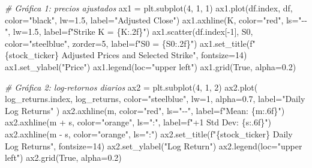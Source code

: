 \documentclass[
  11pt,
]{article}
\newenvironment{Shaded}{}{}
\newcommand{\CommentTok}[1]{\textcolor[rgb]{0.38,0.63,0.69}{\textit{#1}}}
\newcommand{\DecValTok}[1]{\textcolor[rgb]{0.25,0.63,0.44}{#1}}
\newcommand{\FloatTok}[1]{\textcolor[rgb]{0.25,0.63,0.44}{#1}}
\newcommand{\NormalTok}[1]{#1}
\newcommand{\OperatorTok}[1]{\textcolor[rgb]{0.40,0.40,0.40}{#1}}
\newcommand{\SpecialCharTok}[1]{\textcolor[rgb]{0.25,0.44,0.63}{#1}}
\newcommand{\SpecialStringTok}[1]{\textcolor[rgb]{0.73,0.40,0.53}{#1}}
\newcommand{\StringTok}[1]{\textcolor[rgb]{0.25,0.44,0.63}{#1}}
\newcommand{\VariableTok}[1]{\textcolor[rgb]{0.10,0.09,0.49}{#1}}
\begin{document}
\begin{Shaded}
\begin{Highlighting}[]
\CommentTok{\# Gráfica 1: precios ajustados}
\NormalTok{ax1 }\OperatorTok{=}\NormalTok{ plt.subplot(}\DecValTok{4}\NormalTok{, }\DecValTok{1}\NormalTok{, }\DecValTok{1}\NormalTok{)}
\NormalTok{ax1.plot(df.index, df, color}\OperatorTok{=}\StringTok{"black"}\NormalTok{, lw}\OperatorTok{=}\FloatTok{1.5}\NormalTok{, label}\OperatorTok{=}\StringTok{"Adjusted Close"}\NormalTok{)}
\NormalTok{ax1.axhline(K, color}\OperatorTok{=}\StringTok{"red"}\NormalTok{, ls}\OperatorTok{=}\StringTok{"{-}{-}"}\NormalTok{, lw}\OperatorTok{=}\FloatTok{1.5}\NormalTok{, label}\OperatorTok{=}\SpecialStringTok{f"Strike K = }\SpecialCharTok{\{}\NormalTok{K}\SpecialCharTok{:.2f\}}\SpecialStringTok{"}\NormalTok{)}
\NormalTok{ax1.scatter(df.index[}\OperatorTok{{-}}\DecValTok{1}\NormalTok{], S0, color}\OperatorTok{=}\StringTok{"steelblue"}\NormalTok{, zorder}\OperatorTok{=}\DecValTok{5}\NormalTok{, label}\OperatorTok{=}\SpecialStringTok{f"S0 = }\SpecialCharTok{\{}\NormalTok{S0}\SpecialCharTok{:.2f\}}\SpecialStringTok{"}\NormalTok{)}
\NormalTok{ax1.set\_title(}\SpecialStringTok{f"}\SpecialCharTok{\{}\NormalTok{stock\_ticker}\SpecialCharTok{\}}\SpecialStringTok{ Adjusted Prices and Selected Strike"}\NormalTok{, fontsize}\OperatorTok{=}\DecValTok{14}\NormalTok{)}
\NormalTok{ax1.set\_ylabel(}\StringTok{"Price"}\NormalTok{)}
\NormalTok{ax1.legend(loc}\OperatorTok{=}\StringTok{"upper left"}\NormalTok{)}
\NormalTok{ax1.grid(}\VariableTok{True}\NormalTok{, alpha}\OperatorTok{=}\FloatTok{0.2}\NormalTok{)}

\CommentTok{\# Gráfica 2: log{-}retornos diarios}
\NormalTok{ax2 }\OperatorTok{=}\NormalTok{ plt.subplot(}\DecValTok{4}\NormalTok{, }\DecValTok{1}\NormalTok{, }\DecValTok{2}\NormalTok{)}
\NormalTok{ax2.plot(}
\NormalTok{    log\_returns.index,}
\NormalTok{    log\_returns,}
\NormalTok{    color}\OperatorTok{=}\StringTok{"steelblue"}\NormalTok{,}
\NormalTok{    lw}\OperatorTok{=}\DecValTok{1}\NormalTok{,}
\NormalTok{    alpha}\OperatorTok{=}\FloatTok{0.7}\NormalTok{,}
\NormalTok{    label}\OperatorTok{=}\StringTok{"Daily Log Returns"}
\NormalTok{)}
\NormalTok{ax2.axhline(m, color}\OperatorTok{=}\StringTok{"red"}\NormalTok{, ls}\OperatorTok{=}\StringTok{"{-}{-}"}\NormalTok{, label}\OperatorTok{=}\SpecialStringTok{f"Mean: }\SpecialCharTok{\{}\NormalTok{m}\SpecialCharTok{:.6f\}}\SpecialStringTok{"}\NormalTok{)}
\NormalTok{ax2.axhline(m }\OperatorTok{+}\NormalTok{ s, color}\OperatorTok{=}\StringTok{"orange"}\NormalTok{, ls}\OperatorTok{=}\StringTok{":"}\NormalTok{, label}\OperatorTok{=}\SpecialStringTok{f"+1 Std Dev: }\SpecialCharTok{\{}\NormalTok{s}\SpecialCharTok{:.6f\}}\SpecialStringTok{"}\NormalTok{)}
\NormalTok{ax2.axhline(m }\OperatorTok{{-}}\NormalTok{ s, color}\OperatorTok{=}\StringTok{"orange"}\NormalTok{, ls}\OperatorTok{=}\StringTok{":"}\NormalTok{)}
\NormalTok{ax2.set\_title(}\SpecialStringTok{f"}\SpecialCharTok{\{}\NormalTok{stock\_ticker}\SpecialCharTok{\}}\SpecialStringTok{ Daily Log Returns"}\NormalTok{, fontsize}\OperatorTok{=}\DecValTok{14}\NormalTok{)}
\NormalTok{ax2.set\_ylabel(}\StringTok{"Log Return"}\NormalTok{)}
\NormalTok{ax2.legend(loc}\OperatorTok{=}\StringTok{"upper left"}\NormalTok{)}
\NormalTok{ax2.grid(}\VariableTok{True}\NormalTok{, alpha}\OperatorTok{=}\FloatTok{0.2}\NormalTok{)}


\end{Highlighting}
\end{Shaded}
\end{document}
